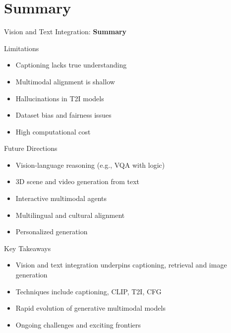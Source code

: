 \section{Summary}
\begin{frame}{}
    \LARGE Vision and Text Integration: \textbf{Summary}
\end{frame}

\begin{frame}{Limitations}
    \begin{itemize}
        \item Captioning lacks true understanding
        \item Multimodal alignment is shallow
        \item Hallucinations in T2I models
        \item Dataset bias and fairness issues
        \item High computational cost
    \end{itemize}
\end{frame}

\begin{frame}{Future Directions}
    \begin{itemize}
        \item Vision-language reasoning (e.g., VQA with logic)
        \item 3D scene and video generation from text
        \item Interactive multimodal agents
        \item Multilingual and cultural alignment
        \item Personalized generation
    \end{itemize}
\end{frame}

\begin{frame}{Key Takeaways}
    \begin{itemize}
        \item Vision and text integration underpins captioning, retrieval and image generation
        \item Techniques include captioning, CLIP, T2I, CFG
        \item Rapid evolution of generative multimodal models
        \item Ongoing challenges and exciting frontiers
    \end{itemize}
\end{frame}